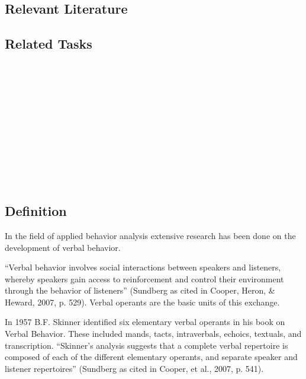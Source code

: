 \subsection{Relevant Literature}
\begin{refsection}
\nocite{cooper2007applied,
    malott2003principles,
    mazur2002learning}
\printbibliography[heading=none]
\end{refsection}
%
\subsection{Related Tasks}
\fouraOne{}\\
\fouraTwo{}\\
\fouraSeven{}\\
\fourdThree{}\\
\foureOne{}\\
\foureTwelve{}\\
\fourhOne{}\\
\fourFKTen{}\\
\fourFKEleven{}\\
\fourFKFourtySeven{}\\
%
%
%
%
%                   
%
%
\section[\fourdNine{}]{\fourdNine{}%
              }
\subsection{Definition}
In the field of applied behavior analysis extensive research has been done on the development of verbal behavior.  

``Verbal behavior involves social interactions between speakers and listeners, whereby speakers gain access to reinforcement and control their environment through the behavior of listeners'' (Sundberg as cited in Cooper, Heron, \& Heward, 2007, p. 529). Verbal operants are the basic units of this exchange.  

In 1957 B.F. Skinner identified six elementary verbal operants in his book on Verbal Behavior.  These included mands, tacts, intraverbals, echoics, textuals, and transcription.  ``Skinner's analysis suggests that a complete verbal repertoire is composed of each of the different elementary operants, and separate speaker and listener repertoires'' (Sundberg as cited in Cooper, et al., 2007, p. 541).   

